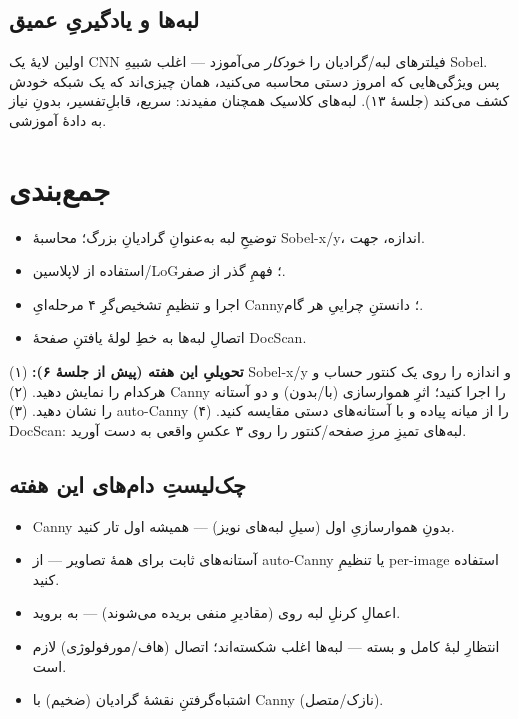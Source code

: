 \documentclass[12pt,a4paper]{article}
\begin{document}
\subsection{لبه‌ها و یادگیریِ عمیق}

اولین لایهٔ یک CNN فیلترهای لبه/گرادیان را \emph{خودکار} می‌آموزد — اغلب شبیهِ Sobel. پس ویژگی‌هایی
که امروز دستی محاسبه می‌کنید، همان چیزی‌اند که یک شبکه خودش کشف می‌کند (جلسهٔ ۱۳). لبه‌های کلاسیک
همچنان مفیدند: سریع، قابلِ‌تفسیر، بدونِ نیاز به دادهٔ آموزشی.

\section{جمع‌بندی}

\begin{itemize}
  \item توضیحِ لبه به‌عنوانِ گرادیانِ بزرگ؛ محاسبهٔ Sobel-x/y، اندازه، جهت.
  \item استفاده از لاپلاسین/LoG؛ فهمِ گذر از صفر.
  \item اجرا و تنظیمِ تشخیص‌گرِ ۴ مرحله‌ایِ Canny؛ دانستنِ چراییِ هر گام.
  \item اتصالِ لبه‌ها به خطِ لولهٔ یافتنِ صفحهٔ DocScan.
\end{itemize}

\begin{tamrin}
\textbf{تحویلیِ این هفته (پیش از جلسهٔ ۶):} (۱) Sobel-x/y و اندازه را روی یک کنتور حساب و هرکدام
را نمایش دهید. (۲) Canny را اجرا کنید؛ اثرِ هموارسازی (با/بدون) و دو آستانه را نشان دهید. (۳)
auto-Canny را از میانه پیاده و با آستانه‌های دستی مقایسه کنید. (۴) DocScan: لبه‌های تمیزِ مرزِ
صفحه/کنتور را روی ۳ عکسِ واقعی به دست آورید.
\end{tamrin}

\subsection*{چک‌لیستِ دام‌های این هفته}

\begin{itemize}
  \item Canny بدونِ هموارسازیِ اول (سیلِ لبه‌های نویز) — همیشه اول تار کنید.
  \item آستانه‌های ثابت برای همهٔ تصاویر — از auto-Canny یا تنظیمِ per-image استفاده کنید.
  \item اعمالِ کرنلِ لبه روی  (مقادیرِ منفی بریده می‌شوند) — به  بروید.
  \item انتظارِ لبهٔ کامل و بسته — لبه‌ها اغلب شکسته‌اند؛ اتصال (هاف/مورفولوژی) لازم است.
  \item اشتباه‌گرفتنِ نقشهٔ گرادیان (ضخیم) با Canny (نازک/متصل).
\end{itemize}
\end{document}

